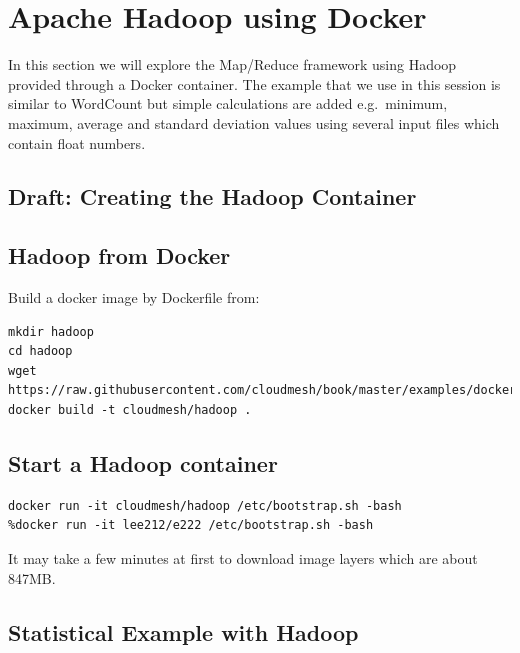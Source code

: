 
\FILENAME

\chapter{Apache Hadoop using Docker}


In this section we will explore the 
Map/Reduce framework using Hadoop provided through a Docker
container. The example that we use in this session is similar to
WordCount but simple calculations are added e.g.\ minimum, maximum,
average and standard deviation values using several input files which
contain float numbers.

\section{Draft: Creating the Hadoop Container}

\section{Hadoop from Docker}

Build a docker image by Dockerfile from:

\begin{lstlisting}
mkdir hadoop
cd hadoop
wget https://raw.githubusercontent.com/cloudmesh/book/master/examples/docker/hadoop/Dockerfile
docker build -t cloudmesh/hadoop .
\end{lstlisting}


\section{Start a Hadoop container}

\begin{lstlisting}
docker run -it cloudmesh/hadoop /etc/bootstrap.sh -bash
%docker run -it lee212/e222 /etc/bootstrap.sh -bash
\end{lstlisting}

It may take a few minutes at first to download image layers which are
about 847MB\@.

\section{Statistical Example with Hadoop}       

